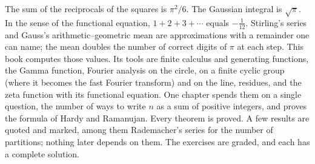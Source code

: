The sum of the reciprocals of the squares is $\pi^2/6$. The Gaussian integral is $\sqrt\pi$. In the sense of the functional equation, $1+2+3+\cdots$ equals $-\frac1{12}$. Stirling's series and Gauss's arithmetic--geometric mean are approximations with a remainder one can name; the mean doubles the number of correct digits of $\pi$ at each step. This book computes those values. Its tools are finite calculus and generating functions, the Gamma function, Fourier analysis on the circle, on a finite cyclic group (where it becomes the fast Fourier transform) and on the line, residues, and the zeta function with its functional equation. One chapter spends them on a single question, the number of ways to write $n$ as a sum of positive integers, and proves the formula of Hardy and Ramanujan. Every theorem is proved. A few results are quoted and marked, among them Rademacher's series for the number of partitions; nothing later depends on them. The exercises are graded, and each has a complete solution.
